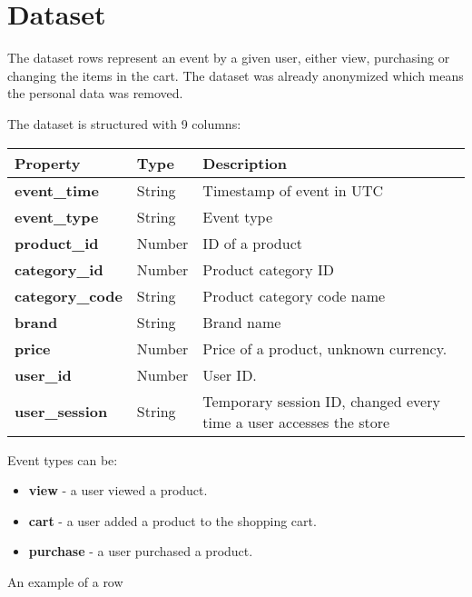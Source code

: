 \section{Dataset}
\label{dataset}

The dataset rows represent an event by a given user, either view, purchasing or changing the items in the cart.
The dataset was already anonymized which means the personal data was removed.

The dataset is structured with 9 columns:
\begin{center}
\begin{tabular}{ | p{3cm} | p{2cm} | p{5cm} | } 
 \hline
 \textbf{Property} & \textbf{Type} & \textbf{Description} \\  
 \hline
 \textbf{event\_time} & String & Timestamp of event in UTC \\
 \hline
 \textbf{event\_type} & String & Event type \\
 \hline
 \textbf{product\_id} & Number & ID of a product \\
 \hline
 \textbf{category\_id} & Number & Product category ID \\
 \hline
 \textbf{category\_code} & String & Product category code name \\
 \hline
 \textbf{brand} & String & Brand name \\
 \hline
 \textbf{price} & Number & Price of a product, unknown currency. \\
 \hline
 \textbf{user\_id} & Number & User ID. \\
 \hline
 \textbf{user\_session} & String & Temporary session ID, changed every time a user accesses the store \\
 \hline
\end{tabular}
\end{center}

Event types can be:
\begin{itemize}
    \item \textbf{view} - a user viewed a product.
    \item \textbf{cart} - a user added a product to the shopping cart.
    \item \textbf{purchase} - a user purchased a product.
\end{itemize}

An example of a row

